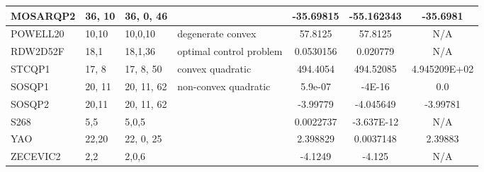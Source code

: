 \documentclass{article}
\begin{document}
\begin{tabular}{l | l |   >{\footnotesize}p{1.8cm} |  >{\footnotesize}p{2.1cm} | c | c | c  }
MOSARQP2 &36, 10 & 36, 0, 46 &    & -35.69815  & -55.162343  & -35.6981 \\ \hline
POWELL20 & 10,10  & 10,0,10 & degenerate convex & 57.8125 & 57.8125  & N/A  \\\hline
RDW2D52F & 18,1  & 18,1,36 & optimal control problem & 0.0530156 & 0.020779 & N/A \\\hline
STCQP1  & 17, 8  &  17, 8, 50 & convex quadratic  & 494.4054  & 494.52085  & 4.945209E+02 \\\hline
SOSQP1 &  20, 11 & 20, 11, 62 & non-convex quadratic & 5.9e-07 & -4E-16   & 0.0 \\\hline
SOSQP2 & 20,11  &  20, 11, 62 &  	& -3.99779  & -4.045649  & -3.99781    \\\hline
S268   &   5,5   & 5,0,5  &   &   0.0022737  &  -3.637E-12  & N/A  \\\hline
YAO   &  22,20  & 22, 0, 25 & & 2.398829  & 0.0037148 & 2.39883  \\\hline
ZECEVIC2 & 2,2 & 2,0,6  & & -4.1249  & -4.125  & N/A  \\\hline
\end{tabular}   %
\end{document}
